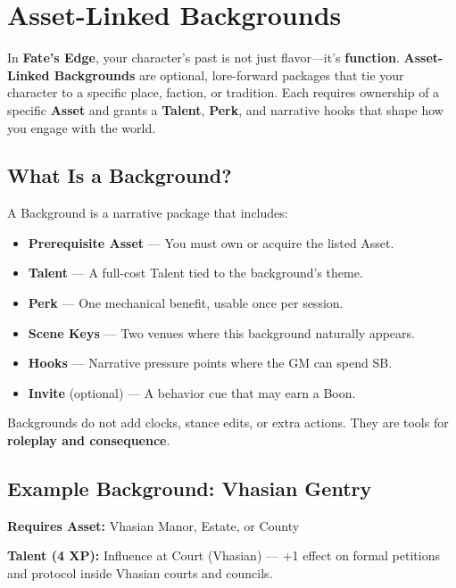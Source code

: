 
\chapter{Asset-Linked Backgrounds}
\label{ch:backgrounds}

In \textbf{Fate's Edge}, your character's past is not just flavor—it's \textbf{function}. \textbf{Asset-Linked Backgrounds} are optional, lore-forward packages that tie your character to a specific place, faction, or tradition. Each requires ownership of a specific \textbf{Asset} and grants a \textbf{Talent}, \textbf{Perk}, and narrative hooks that shape how you engage with the world.

\section{What Is a Background?}

A Background is a narrative package that includes:

\begin{itemize}
  \item \textbf{Prerequisite Asset} — You must own or acquire the listed Asset.
  \item \textbf{Talent} — A full-cost Talent tied to the background's theme.
  \item \textbf{Perk} — One mechanical benefit, usable once per session.
  \item \textbf{Scene Keys} — Two venues where this background naturally appears.
  \item \textbf{Hooks} — Narrative pressure points where the GM can spend SB.
  \item \textbf{Invite} (optional) — A behavior cue that may earn a Boon.
\end{itemize}

Backgrounds do not add clocks, stance edits, or extra actions. They are tools for \textbf{roleplay and consequence}.

\section{Example Background: Vhasian Gentry}

\textbf{Requires Asset:} Vhasian Manor, Estate, or County

\textbf{Talent (4 XP):} Influence at Court (Vhasian) — +1 effect on formal petitions and protocol inside Vhasian courts and councils.

